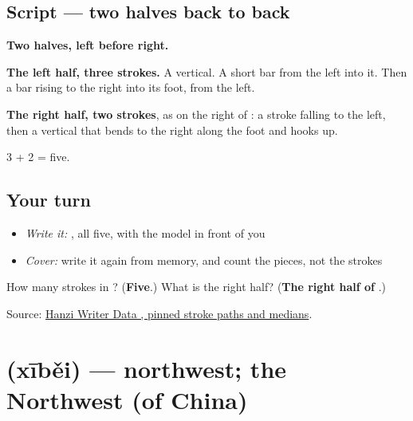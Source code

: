 \subsection*{Script — two halves back to back}

\begin{quote}
\end{quote}

\textbf{Two halves, left before right.}

\textbf{The left half, three strokes.} A vertical. A short bar from the left into it. Then a bar rising to the right into its foot, from the left.

\textbf{The right half, two strokes}, as on the right of : a stroke falling to the left, then a vertical that bends to the right along the foot and hooks up.

3 + 2 = five.

\subsection*{Your turn}
\begin{itemize}
\raggedright
  \item \emph{Write it:} , all five, with the model in front of you
  \item \emph{Cover:} write it again from memory, and count the pieces, not the strokes
\end{itemize}

\begin{tcolorbox}[breakable,colback=teal!4,colframe=teal!35!black,title={Before you move on}]
How many strokes in ? (\textbf{Five}.) What is the right half? (\textbf{The right half of }.)

Source: \href{https://raw.githubusercontent.com/chanind/hanzi-writer-data/68d10a4b21150cae5e1ebbd223eed289cf32d90c/data/\%E5\%8C\%97.json}{Hanzi Writer Data , pinned stroke paths and medians}.
\end{tcolorbox}
\section[\texorpdfstring{\zh{西北} (xīběi)}{西北 (xīběi)}]{ (xīběi) — northwest; the Northwest (of China)}

\label{lesson:ZH-C422-xibei}



